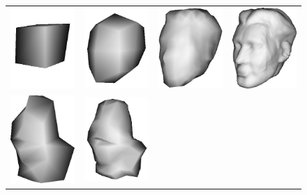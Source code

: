 \begin{figure}
\begin{center}
\begin{tabular}{cccc}
\includegraphics[width=3cm]{../images/cubehead_level0} &
\includegraphics[width=3cm]{../images/cubehead_level1} &
\includegraphics[width=3cm]{../images/cubehead_level3} &
\includegraphics[width=3cm]{../images/cubehead_level5} \\
\includegraphics[width=3cm]{../images/dinohead_level0} &
\includegraphics[width=3cm]{../images/dinohead_level1} &

\end{tabular}
\end{center}
\end{figure}
